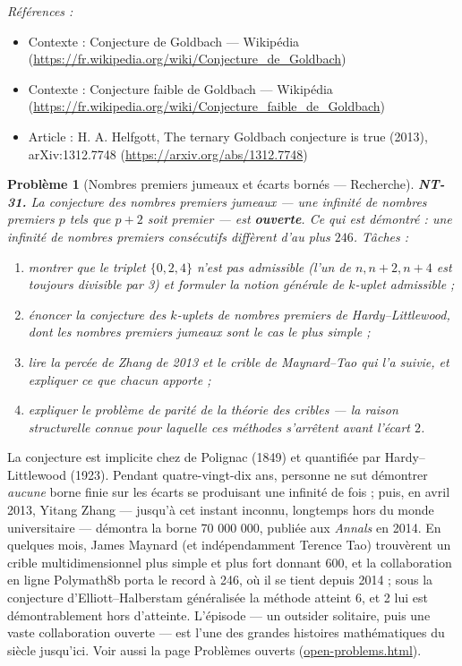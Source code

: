 \documentclass[11pt]{article}
\newtheorem{problem}{Problème}
\newenvironment{refs}{\par\small\noindent\emph{Références :}\begin{itemize}\setlength\itemsep{0pt}}{\end{itemize}\normalsize}
\begin{document}
\begin{refs}
\item Contexte : Conjecture de Goldbach --- Wikipédia (\url{https://fr.wikipedia.org/wiki/Conjecture_de_Goldbach})
\item Contexte : Conjecture faible de Goldbach --- Wikipédia (\url{https://fr.wikipedia.org/wiki/Conjecture_faible_de_Goldbach})
\item Article : H. A. Helfgott, \og{} The ternary Goldbach conjecture is true \fg{} (2013), arXiv:1312.7748 (\url{https://arxiv.org/abs/1312.7748})
\end{refs}

\bigskip

\begin{problem}[{Nombres premiers jumeaux et écarts bornés --- Recherche}]
\textbf{NT-31.} La conjecture des nombres premiers jumeaux --- une infinité de nombres premiers
$p$ tels que $p + 2$ soit premier --- est \textbf{ouverte}. Ce qui est démontré : une infinité de
nombres premiers consécutifs diffèrent d'au plus $246$. Tâches :
\begin{enumerate}
\item[(i)] montrer que le triplet
$\{0, 2, 4\}$ n'est pas admissible (l'un de $n, n+2, n+4$ est toujours divisible par 3)
et formuler la notion générale de $k$-uplet admissible ;
\item[(ii)] énoncer la
conjecture des $k$-uplets de nombres premiers de Hardy--Littlewood, dont les nombres premiers
jumeaux sont le cas le plus simple ;
\item[(iii)] lire la percée de Zhang de 2013 et le crible de Maynard--Tao qui l'a suivie, et
expliquer ce que chacun apporte ;
\item[(iv)] expliquer le problème de parité de la théorie des cribles --- la
raison structurelle connue pour laquelle ces méthodes s'arrêtent avant l'écart $2$.
\end{enumerate}

\end{problem}

\noindent La conjecture est implicite chez de Polignac (1849) et quantifiée par
Hardy--Littlewood (1923). Pendant quatre-vingt-dix ans, personne ne sut démontrer \textit{aucune} borne
finie sur les écarts se produisant une infinité de fois ; puis, en avril 2013, Yitang Zhang --- jusqu'à
cet instant inconnu, longtemps hors du monde universitaire --- démontra la borne 70 000 000, publiée
aux \textit{Annals} en 2014. En quelques mois, James Maynard (et indépendamment Terence Tao)
trouvèrent un crible multidimensionnel plus simple et plus fort donnant 600, et la collaboration en
ligne Polymath8b porta le record à 246, où il se tient depuis 2014 ; sous la conjecture
d'Elliott--Halberstam généralisée la méthode atteint 6, et 2 lui est démontrablement hors d'atteinte.
L'épisode --- un outsider solitaire, puis une vaste collaboration ouverte --- est l'une des grandes
histoires mathématiques du siècle jusqu'ici. Voir aussi la page
Problèmes ouverts (\url{open-problems.html}).
\end{document}
